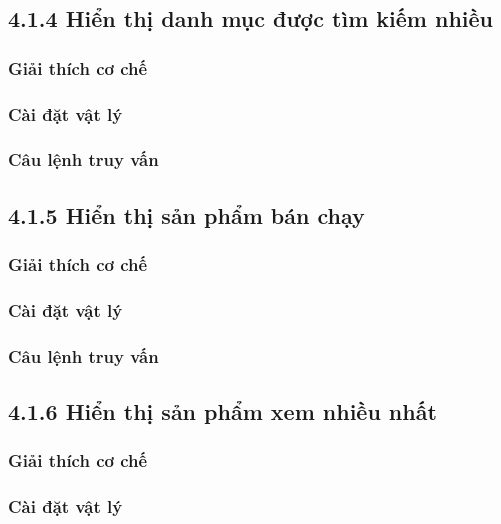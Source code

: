 \subsection{4.1.4 Hiển thị danh mục được tìm kiếm nhiều}

\subsubsection{Giải thích cơ chế}

\subsubsection{Cài đặt vật lý}

\subsubsection{Câu lệnh truy vấn}

\subsection{4.1.5 Hiển thị sản phẩm bán chạy}

\subsubsection{Giải thích cơ chế}

\subsubsection{Cài đặt vật lý}

\subsubsection{Câu lệnh truy vấn}

\subsection{4.1.6 Hiển thị sản phẩm xem nhiều nhất}

\subsubsection{Giải thích cơ chế}

\subsubsection{Cài đặt vật lý}

